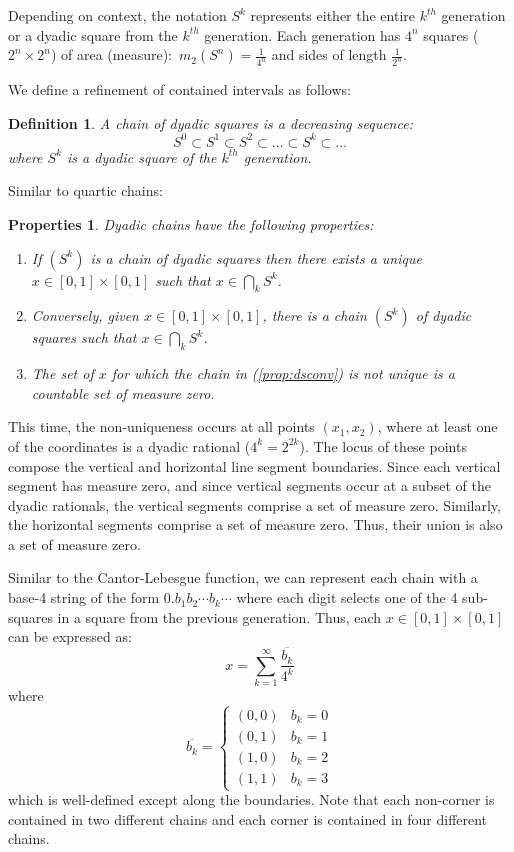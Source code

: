 \documentclass[letterpaper,12pt,fleqn,reqno]{amsart}
\newcommand{\uint}{[0,1]}
\newcommand{\usq}{\uint\times\uint}
\theoremstyle{plain}
\newtheorem{defn}[thm]{Definition}
\newtheorem{prop}[thm]{Properties}
\begin{document}
Depending on context, the notation $S^k$ represents either the entire $k^{th}$
generation or a dyadic square from the $k^{th}$ generation. Each generation
has $4^n$ squares ($2^n\times2^n$) of area (measure):\ $m_2(S^n)=\frac{1}{4^n}$
and sides of length $\frac{1}{2^n}$.

We define a refinement of contained intervals as follows:
\begin{defn}
A \emph{chain} of dyadic squares is a decreasing sequence:
\[S^0\subset S^1\subset S^2\subset\ldots\subset S^k\subset\ldots\]
where $S^k$ is a dyadic square of the $k^{th}$ generation.
\end{defn}

Similar to quartic chains:

\begin{prop}
  Dyadic chains have the following properties:
\begin{enumerate}
\item\label{prop:dsunq} If $(S^k)$ is a chain of dyadic squares then there
exists a unique $x\in\usq$ such that $x\in\bigcap_kS^k$.

\item\label{prop:dsconv} Conversely, given $x\in\usq$, there is a chain
$(S^k)$ of dyadic squares such that $x\in\bigcap_kS^k$.

\item\label{prop:dszero} The set of $x$ for which the chain in
(\ref{prop:dsconv}) is not unique is a countable set of measure zero.
\end{enumerate}
\end{prop}

This time, the non-uniqueness occurs at all points $(x_1,x_2)$, where at least
one of the coordinates is a dyadic rational ($4^k=2^{2k}$). The locus of these
points compose the vertical and horizontal line segment boundaries. Since each
vertical segment has measure zero, and since vertical segments occur at a
subset of the dyadic rationals, the vertical segments comprise a set of
measure zero.  Similarly, the horizontal segments comprise a set of measure
zero.  Thus, their union is also a set of measure zero.

Similar to the Cantor-Lebesgue function, we can represent each chain
with a base-4 string of the form $0.b_1b_2\cdots b_k\cdots$ where each digit
selects one of the 4 sub-squares in a square from the previous generation.
Thus, each $x\in\usq$ can be expressed as:
\begin{equation}
x=\sum_{k=1}^{\infty}\frac{\overline{b_k}}{4^k}
\label{eqn:dyadic}
\end{equation}
where
\[\overline{b_k}=\left\{\begin{array}{ll}
(0,0) & b_k=0 \\
(0,1) & b_k=1 \\
(1,0) & b_k=2 \\
(1,1) & b_k=3\end{array}
\right.\]
which is well-defined except along the boundaries.  Note that each non-corner
is contained in two different chains and each corner is contained in four
different chains.
\end{document}

